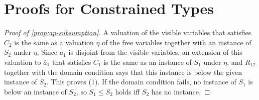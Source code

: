 
\section{Proofs for Constrained Types}\label{app:ap}

\begin{proof}[Proof of \cref{prop:ap-subsumption}]
A valuation of the visible variables that satisfies $C_2$ is the same as a
valuation $\eta$ of the free variables together with an instance of $S_2$
under $\eta$. Since $\bar a_1$ is disjoint from the visible variables, an
extension of this valuation to $\bar a_1$ that satisfies $C_1$ is the same as
an instance of $S_1$ under $\eta$, and $R_{12}$ together with the domain
condition says that this instance is below the given instance of $S_2$. This
proves (1). If the domain condition fails, no instance of $S_1$ is below an
instance of $S_2$, so $S_1\le S_2$ holds iff $S_2$ has no instance.
\end{proof}
